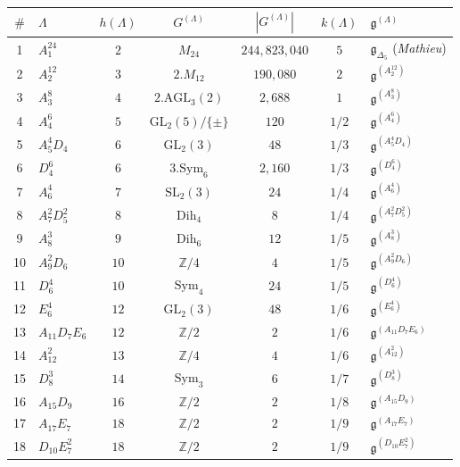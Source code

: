 \begin{theorem}[The umbral BKM enumeration, \texorpdfstring{$A_1^{24}$}{A-1-24} entry \texorpdfstring{$=\Delta_5$}{=Delta-5}]
\begin{center}
\small
\begin{tabular}{c|lccccl}
$\#$ & $\Lambda$ & $h(\Lambda)$ & $G^{(\Lambda)}$ & $|G^{(\Lambda)}|$ & $k(\Lambda)$ & $\mathfrak g^{(\Lambda)}$ \\\hline
 1 & $A_1^{24}$ & $2$ & $M_{24}$ & $244{,}823{,}040$ & $5$ & $\mathfrak g_{\Delta_5}$ (\textit{Mathieu}) \\
 2 & $A_2^{12}$ & $3$ & $2.M_{12}$ & $190{,}080$ & $2$ & $\mathfrak g^{(A_2^{12})}$ \\
 3 & $A_3^{8}$ & $4$ & $2.\mathrm{AGL}_3(2)$ & $2{,}688$ & $1$ & $\mathfrak g^{(A_3^{8})}$ \\
 4 & $A_4^{6}$ & $5$ & $\mathrm{GL}_2(5)/\{\pm\}$ & $120$ & $1/2$ & $\mathfrak g^{(A_4^{6})}$ \\
 5 & $A_5^{4}D_4$ & $6$ & $\mathrm{GL}_2(3)$ & $48$ & $1/3$ & $\mathfrak g^{(A_5^{4}D_4)}$ \\
 6 & $D_4^{6}$ & $6$ & $3.\mathrm{Sym}_6$ & $2{,}160$ & $1/3$ & $\mathfrak g^{(D_4^{6})}$ \\
 7 & $A_6^{4}$ & $7$ & $\mathrm{SL}_2(3)$ & $24$ & $1/4$ & $\mathfrak g^{(A_6^{4})}$ \\
 8 & $A_7^{2}D_5^{2}$ & $8$ & $\mathrm{Dih}_4$ & $8$ & $1/4$ & $\mathfrak g^{(A_7^{2}D_5^{2})}$ \\
 9 & $A_8^{3}$ & $9$ & $\mathrm{Dih}_6$ & $12$ & $1/5$ & $\mathfrak g^{(A_8^{3})}$ \\
10 & $A_9^{2}D_6$ & $10$ & $\mathbb Z/4$ & $4$ & $1/5$ & $\mathfrak g^{(A_9^{2}D_6)}$ \\
11 & $D_6^{4}$ & $10$ & $\mathrm{Sym}_4$ & $24$ & $1/5$ & $\mathfrak g^{(D_6^{4})}$ \\
12 & $E_6^{4}$ & $12$ & $\mathrm{GL}_2(3)$ & $48$ & $1/6$ & $\mathfrak g^{(E_6^{4})}$ \\
13 & $A_{11}D_7E_6$ & $12$ & $\mathbb Z/2$ & $2$ & $1/6$ & $\mathfrak g^{(A_{11}D_7E_6)}$ \\
14 & $A_{12}^{2}$ & $13$ & $\mathbb Z/4$ & $4$ & $1/6$ & $\mathfrak g^{(A_{12}^{2})}$ \\
15 & $D_8^{3}$ & $14$ & $\mathrm{Sym}_3$ & $6$ & $1/7$ & $\mathfrak g^{(D_8^{3})}$ \\
16 & $A_{15}D_9$ & $16$ & $\mathbb Z/2$ & $2$ & $1/8$ & $\mathfrak g^{(A_{15}D_9)}$ \\
17 & $A_{17}E_7$ & $18$ & $\mathbb Z/2$ & $2$ & $1/9$ & $\mathfrak g^{(A_{17}E_7)}$ \\
18 & $D_{10}E_7^{2}$ & $18$ & $\mathbb Z/2$ & $2$ & $1/9$ & $\mathfrak g^{(D_{10}E_7^{2})}$ \\

\end{tabular}
\end{center}
\end{theorem}

